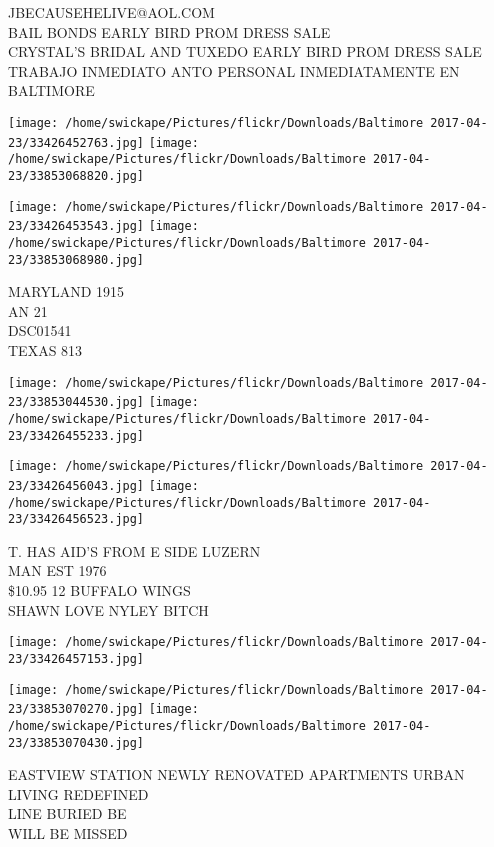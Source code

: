 \documentclass[10pt,letterpaper]{article}
\begin{document}
JBECAUSEHELIVE@AOL.COM\\
BAIL BONDS EARLY BIRD PROM DRESS SALE\\
CRYSTAL'S BRIDAL AND TUXEDO EARLY BIRD PROM DRESS SALE\\
TRABAJO INMEDIATO ANTO PERSONAL INMEDIATAMENTE EN BALTIMORE
\pagebreak

\texttt{[image: /home/swickape/Pictures/flickr/Downloads/Baltimore 2017-04-23/33426452763.jpg]}
\texttt{[image: /home/swickape/Pictures/flickr/Downloads/Baltimore 2017-04-23/33853068820.jpg]}

\texttt{[image: /home/swickape/Pictures/flickr/Downloads/Baltimore 2017-04-23/33426453543.jpg]}
\texttt{[image: /home/swickape/Pictures/flickr/Downloads/Baltimore 2017-04-23/33853068980.jpg]}

MARYLAND 1915\\
AN 21\\
DSC01541\\
TEXAS 813
\pagebreak

\texttt{[image: /home/swickape/Pictures/flickr/Downloads/Baltimore 2017-04-23/33853044530.jpg]}
\texttt{[image: /home/swickape/Pictures/flickr/Downloads/Baltimore 2017-04-23/33426455233.jpg]}

\texttt{[image: /home/swickape/Pictures/flickr/Downloads/Baltimore 2017-04-23/33426456043.jpg]}
\texttt{[image: /home/swickape/Pictures/flickr/Downloads/Baltimore 2017-04-23/33426456523.jpg]}

T. HAS AID'S FROM E SIDE LUZERN\\
MAN EST 1976\\
\$10.95 12 BUFFALO WINGS\\
SHAWN LOVE NYLEY BITCH
\pagebreak

\texttt{[image: /home/swickape/Pictures/flickr/Downloads/Baltimore 2017-04-23/33426457153.jpg]}

\vspace{0.25in}
\texttt{[image: /home/swickape/Pictures/flickr/Downloads/Baltimore 2017-04-23/33853070270.jpg]}
\texttt{[image: /home/swickape/Pictures/flickr/Downloads/Baltimore 2017-04-23/33853070430.jpg]}

EASTVIEW STATION NEWLY RENOVATED APARTMENTS URBAN LIVING REDEFINED\\
LINE BURIED BE\\
WILL BE MISSED
\pagebreak
\end{document}
